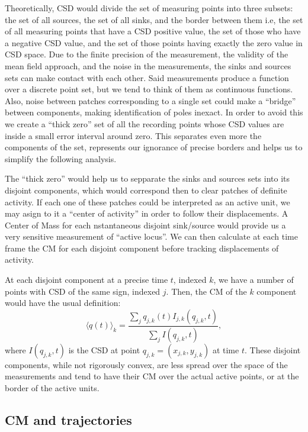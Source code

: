 \documentclass{article}
\begin{document}
Theoretically, CSD would divide the set of measuring points into three subsets: the set of all sources, the set of all sinks, and the border between them i.e, the set of all measuring points that have a CSD positive value, the set of those who have a negative CSD value, and the set of those points having exactly the zero value in CSD space.
Due to the finite precision of the measurement, the validity of the mean field approach, and the noise in the measurements, the sinks and sources sets can make contact with each other. Said measurements produce a function over a discrete point set, but we tend to think of them as continuous functions. Also, noise between patches corresponding to a single set could make a ``bridge'' between components, making identification of poles inexact. In order to avoid this we create a ``thick zero'' set of all the recording points whose CSD values are inside a small error interval around zero. This separates even more the components of the set, represents our ignorance of precise borders and helps us to simplify the following analysis.

The ``thick zero'' would help us to sepparate the sinks and sources sets into its disjoint components, which would correspond then to clear patches of definite activity. If each one of these patches could be interpreted as an active unit, we may asign to it a ``center of activity'' in order to follow their displacements. A Center of Mass for each nstantaneous disjoint sink/source would provide us a very sensitive measurement of ``active locus''. We can then calculate at each time frame the CM for each disjoint component before tracking displacements of activity.

At each disjoint component at a precise time $t$, indexed $k$, we have a number of points with CSD of the same sign, indexed $j$. Then, the CM of the $k$ component would have the usual definition:
\begin{equation}\label{cmparadisj}
   \langle q(t) \rangle_k =\frac{\sum_j q_{j,k} (t) I_{j,k} (q_{j,k},t)}
           {\sum_j I(q_{j,k},t)},
\end{equation}
where $I(q_{j,k},t)$ is the CSD at point $q_{j,k}=(x_{j,k}, y_{j,k})$ at time $t$. These disjoint components, while not rigorously convex, are less spread over the space of the measurements and tend to have their CM over the actual active points, or at the border of the active units.

\subsection{CM and trajectories}
\end{document}
